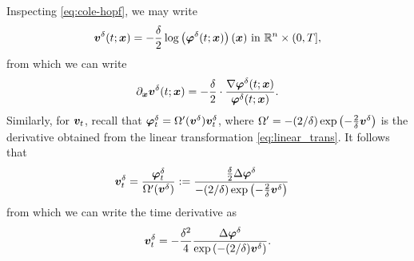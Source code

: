 %
%
Inspecting \eqref{eq:cole-hopf}, we may write
%
\begin{subequations}
\begin{align}
	\bm{v}^\delta(t; \bm{x}) = -\dfrac{\delta}{2} \log \left(\bm{\varphi}^\delta(t; \bm{x})\right)(\bm{x}) \text{ in } \mathbb{R}^n \times (0, T],
\end{align}  
\label{eq:value_as_colehopf}
\end{subequations}
%
from which we can write
%
\begin{align}
\partial_{\bm{x}}\bm{v}^\delta(t; \bm{x}) = - \dfrac{\delta}{2}\cdot \dfrac{	\nabla \bm{\varphi}^\delta(t; \bm{x})}{\bm{\varphi}^\delta(t; \bm{x})}.
\label{eq:spatial_cole_hopf}
\end{align}
%
Similarly,  for $\bm{v}_t$, recall that $\bm{\varphi}_t^\delta = \Omega^\prime(\bm{v}^\delta) \bm{v}^\delta_t$, where $\Omega^\prime = -(2/\delta) \exp\left(-\frac{2}{\delta}\bm{v}^\delta\right)$ is the derivative obtained from the linear transformation \eqref{eq:linear_trans}. It follows that 
%
\begin{align}
	\bm{v}_t^\delta &= \dfrac{\bm{\varphi}_t^\delta}{\Omega^\prime (\bm{v}^\delta)} := \dfrac{\frac{\delta}{2} \Delta \bm{\varphi}^\delta}{-(2/\delta) \exp\left(-\frac{2}{\delta}\bm{v}^\delta\right)}
\end{align}
%
from which we can write the time derivative as 
%	
\begin{align}
	\bm{v}_t^\delta = - \dfrac{\delta^2}{4} \dfrac{\Delta \bm{\varphi}^\delta}{\exp\left(-(2/\delta) \bm{v}^\delta \right)}.
\end{align}




